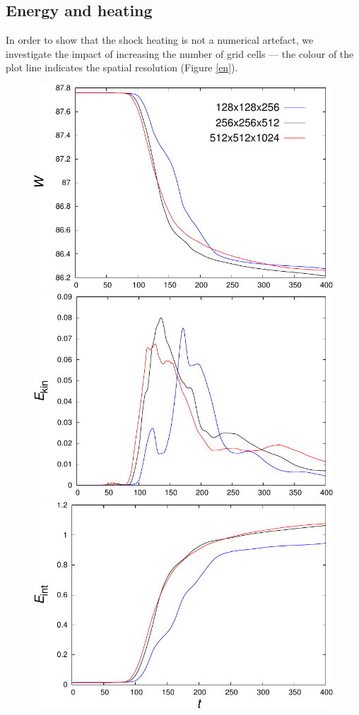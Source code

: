 \documentclass{./packages/rs/rsproca}
\begin{document}
\subsection{Energy and heating}
\label{sec_NumericalResults_EnergyHeating}

In order to show that the shock heating is not a numerical artefact, we investigate the impact of increasing the number of grid cells --- the colour of the plot line indicates the spatial resolution (Figure \ref{en}).
\begin{figure}[h!]
  \center  
  \includegraphics[scale=0.5]{./gnuplot/en_w}
  \includegraphics[scale=0.5]{./gnuplot/en_kin}\\
  \vspace{10pt}
  \includegraphics[scale=0.5]{./gnuplot/en_int}

\end{figure}
\end{document}
